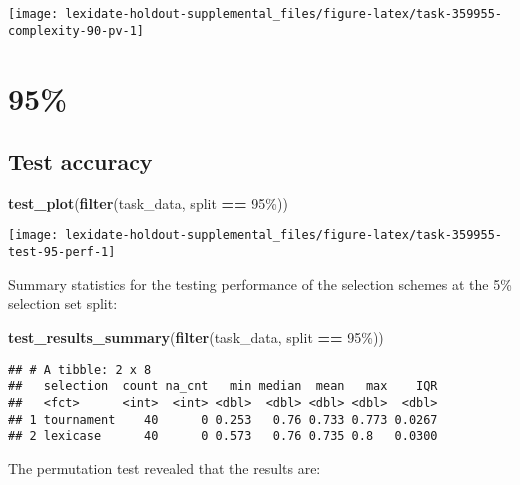 \documentclass[
]{book}
\newenvironment{Shaded}{\begin{snugshade}}{\end{snugshade}}
\newcommand{\FunctionTok}[1]{\textcolor[rgb]{0.13,0.29,0.53}{\textbf{#1}}}
\newcommand{\NormalTok}[1]{#1}
\newcommand{\SpecialCharTok}[1]{\textcolor[rgb]{0.81,0.36,0.00}{\textbf{#1}}}
\newcommand{\StringTok}[1]{\textcolor[rgb]{0.31,0.60,0.02}{#1}}
\begin{document}
\texttt{[image: lexidate-holdout-supplemental\_files/figure-latex/task-359955-complexity-90-pv-1]}

\hypertarget{section-14}{%
\section{95\%}\label{section-14}}

\hypertarget{test-accuracy-14}{%
\subsection{Test accuracy}\label{test-accuracy-14}}

\begin{Shaded}
\begin{Highlighting}[]
\FunctionTok{test\_plot}\NormalTok{(}\FunctionTok{filter}\NormalTok{(task\_data, split }\SpecialCharTok{==} \StringTok{\textquotesingle{}95\%\textquotesingle{}}\NormalTok{))}
\end{Highlighting}
\end{Shaded}

\texttt{[image: lexidate-holdout-supplemental\_files/figure-latex/task-359955-test-95-perf-1]}

Summary statistics for the testing performance of the selection schemes at the 5\% selection set split:

\begin{Shaded}
\begin{Highlighting}[]
\FunctionTok{test\_results\_summary}\NormalTok{(}\FunctionTok{filter}\NormalTok{(task\_data, split }\SpecialCharTok{==} \StringTok{\textquotesingle{}95\%\textquotesingle{}}\NormalTok{))}
\end{Highlighting}
\end{Shaded}

\begin{verbatim}
## # A tibble: 2 x 8
##   selection  count na_cnt   min median  mean   max    IQR
##   <fct>      <int>  <int> <dbl>  <dbl> <dbl> <dbl>  <dbl>
## 1 tournament    40      0 0.253   0.76 0.733 0.773 0.0267
## 2 lexicase      40      0 0.573   0.76 0.735 0.8   0.0300
\end{verbatim}

The permutation test revealed that the results are:
\end{document}
